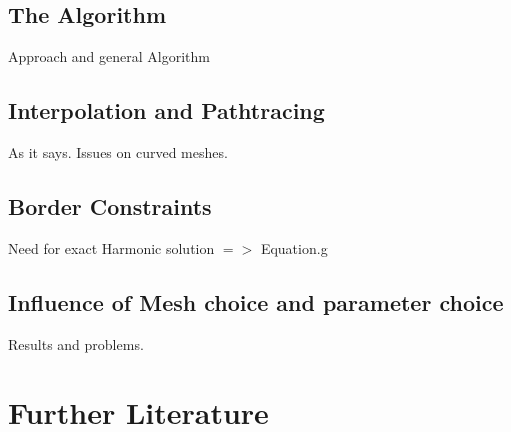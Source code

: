 \section{The Algorithm}
Approach and general Algorithm
\section{Interpolation and Pathtracing}
As it says. Issues on curved meshes.
\section{Border Constraints}
Need for exact Harmonic solution $=>$ Equation.g
\section{Influence of Mesh choice and parameter choice}
Results and problems.

\chapter{Further Literature}